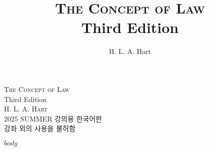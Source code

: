 \documentclass[12pt, oneside]{book}  %
\title{\Huge\textsc{The Concept of Law} \\[2ex] \Large Third Edition}
\author{\Large H. L. A. Hart}
\date{}
\begin{document}
\begin{titlepage}
  \centering
  \vspace*{3cm}
  {\Huge\textsc{The Concept of Law}}\\[1.5ex]
  {\Large Third Edition}\\[4ex]
  \textsc{H. L. A. Hart}\\[6ex]
  {\small 2025 SUMMER 강의용 한국어판\\
  강좌 외의 사용을 불허함}
  \vfill
\end{titlepage}

$body$  %
\end{document}
